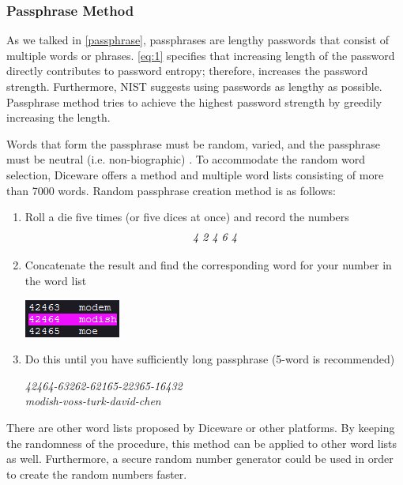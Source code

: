 \documentclass[acmsmall,nonacm]{acmart}
\begin{document}
\subsubsection{Passphrase Method} \label{creation-passphrase}

As we talked in \autoref{passphrase}, passphrases are lengthy passwords that consist of multiple words or phrases. \autoref{eq:1} specifies that increasing length of the password directly contributes to password entropy; therefore, increases the password strength. Furthermore, NIST suggests using passwords as lengthy as possible. Passphrase method tries to achieve the highest password strength by greedily increasing the length.

Words that form the passphrase must be random, varied, and the passphrase must be neutral (i.e. non-biographic) \cite{nist_2020,Kavrestad_2019}. To accommodate the random word selection, Diceware \cite{reinhold_2021} offers a method and multiple word lists consisting of more than 7000 words. Random passphrase creation method is as follows:

\renewcommand{\labelenumi}{\arabic{enumi}.}
\begin{enumerate}
    \item Roll a die five times (or five dices at once) and record the numbers 
    \begin{align*}
        \emph{4  2  4  6  4}
    \end{align*}
    \item Concatenate the result and find the corresponding word for your number in the word list 
    \begin{center}
        \includegraphics{modish1}
    \end{center}
    
    \item Do this until you have sufficiently long passphrase (5-word is recommended)
    \begin{center}
        \emph{42464-63262-62165-22365-16432}\\
        \emph{modish-voss-turk-david-chen}
    \end{center}
\end{enumerate}

There are other word lists proposed by Diceware or other platforms. By keeping the randomness of the procedure, this method can be applied to other word lists as well. Furthermore, a secure random number generator could be used in order to create the random numbers faster.
\end{document}
